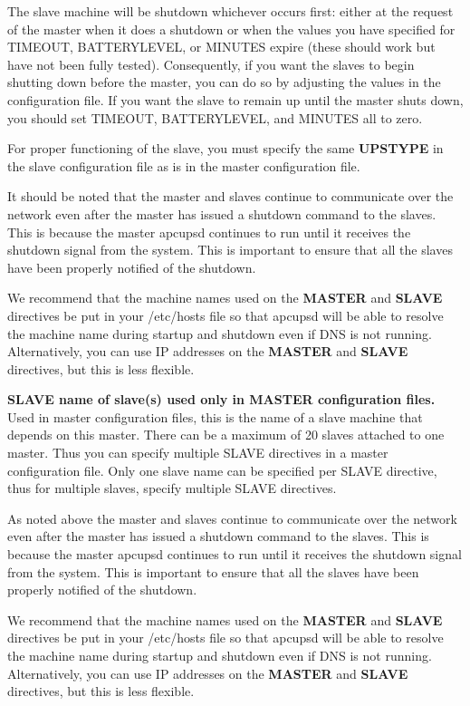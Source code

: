 {{{{{{{{{{{{{{\begin{description}
{The slave machine will be shutdown whichever occurs first: either at the
request of the master when it does a shutdown or when the values you have
specified for TIMEOUT, BATTERYLEVEL, or MINUTES expire (these should work but
have not been fully tested). Consequently, if you want the slaves to begin
shutting down before the master, you can do so by adjusting the values in the
configuration file. If you want the slave to remain up until the master shuts
down, you should set TIMEOUT, BATTERYLEVEL, and MINUTES all to zero.  

For proper functioning of the slave, you must specify the same {\bf UPSTYPE}
in the slave configuration file as is in the master configuration file.  

It should be noted that the master and slaves continue to communicate over the
network even after the master has issued a shutdown command to the slaves.
This is because the master apcupsd continues to run until it receives the
shutdown signal from the system. This is important to ensure that all the
slaves have been properly notified of the shutdown.  

We recommend that the machine names used on the {\bf MASTER} and {\bf SLAVE}
directives be put in your /etc/hosts file so that apcupsd will be able to
resolve the machine name during startup and shutdown even if DNS is not
running. Alternatively, you can use IP addresses on the {\bf MASTER} and {\bf
SLAVE} directives, but this is less flexible.  

\item {\bf SLAVE \lt{}name of slave(s)\gt{} used only in MASTER configuration
files.}
Used in master configuration files, this is the name of a slave machine that
depends on this master. There can be a maximum of 20 slaves attached to one
master. Thus you can specify multiple SLAVE directives in a master
configuration file. Only one slave name can be specified per SLAVE directive,
thus for multiple slaves, specify multiple SLAVE directives.  

As noted above the master and slaves continue to communicate over the network
even after the master has issued a shutdown command to the slaves. This is
because the master apcupsd continues to run until it receives the shutdown
signal from the system. This is important to ensure that all the slaves have
been properly notified of the shutdown.  

We recommend that the machine names used on the {\bf MASTER} and {\bf SLAVE}
directives be put in your /etc/hosts file so that apcupsd will be able to
resolve the machine name during startup and shutdown even if DNS is not
running. Alternatively, you can use IP addresses on the {\bf MASTER} and {\bf
SLAVE} directives, but this is less flexible.  

}
\end{description}}}}}}}}}}}}}}}

